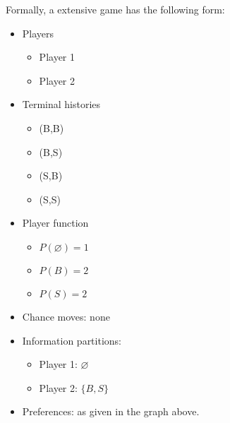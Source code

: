 \begin{illustration}Formally, a extensive game has the following form:
    \begin{itemize}[noitemsep]
        \item Players
              \begin{itemize}[noitemsep]
                  \item Player 1
                  \item Player 2
              \end{itemize}
        \item Terminal histories
              \begin{itemize}[noitemsep]
                  \item (B,B)
                  \item (B,S)
                  \item (S,B)
                  \item(S,S)
              \end{itemize}
        \item Player function
              \begin{itemize}[noitemsep]
                  \item $P(\varnothing)=1$
                  \item $P(B)=2$
                  \item $P(S)=2$
              \end{itemize}
        \item Chance moves: none
        \item Information partitions:
              \begin{itemize}[noitemsep]
                  \item Player 1: $\varnothing$
                  \item Player 2: $\{B,S\}$
              \end{itemize}
        \item Preferences: as given in the graph above.
    \end{itemize}
\end{illustration}

